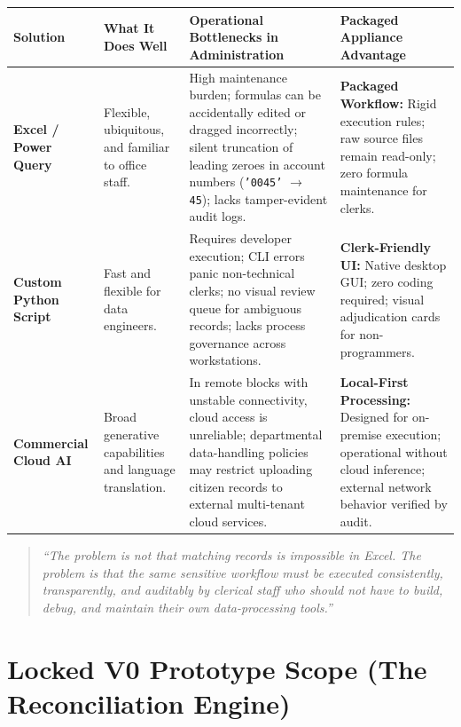 \documentclass[11pt,a4paper]{article}
\newcommand{\code}[1]{\texttt{#1}}
\begin{document}
\vspace{0.15cm}
\noindent
\begin{tabularx}{\textwidth}{|l|Y|Y|Y|}
\hline
\textbf{Solution} & \textbf{What It Does Well} & \textbf{Operational Bottlenecks in Administration} & \textbf{Packaged Appliance Advantage} \\
\hline
\textbf{Excel / Power Query} 
& Flexible, ubiquitous, and familiar to office staff.
& High maintenance burden; formulas can be accidentally edited or dragged incorrectly; silent truncation of leading zeroes in account numbers (\code{'0045'} $\rightarrow$ \code{45}); lacks tamper-evident audit logs.
& \textbf{Packaged Workflow:} Rigid execution rules; raw source files remain read-only; zero formula maintenance for clerks. \\
\hline
\textbf{Custom Python Script} 
& Fast and flexible for data engineers.
& Requires developer execution; CLI errors panic non-technical clerks; no visual review queue for ambiguous records; lacks process governance across workstations.
& \textbf{Clerk-Friendly UI:} Native desktop GUI; zero coding required; visual adjudication cards for non-programmers. \\
\hline
\textbf{Commercial Cloud AI} 
& Broad generative capabilities and language translation.
& In remote blocks with unstable connectivity, cloud access is unreliable; departmental data-handling policies may restrict uploading citizen records to external multi-tenant cloud services.
& \textbf{Local-First Processing:} Designed for on-premise execution; operational without cloud inference; external network behavior verified by audit. \\
\hline
\end{tabularx}

\vspace{0.15cm}
\begin{quote}
    \textit{“The problem is not that matching records is impossible in Excel. The problem is that the same sensitive workflow must be executed consistently, transparently, and auditably by clerical staff who should not have to build, debug, and maintain their own data-processing tools.”}
\end{quote}

\vspace{0.2cm}

\section{Locked V0 Prototype Scope (The Reconciliation Engine)}
\end{document}
